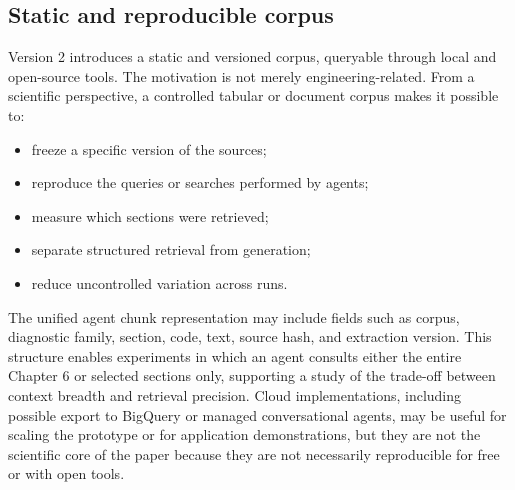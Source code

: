 \documentclass[11pt,a4paper]{article}
\begin{document}
\subsection{Static and reproducible corpus}
Version 2 introduces a static and versioned corpus, queryable through local and open-source tools. The motivation is not merely engineering-related. From a scientific perspective, a controlled tabular or document corpus makes it possible to:
\begin{itemize}
  \item freeze a specific version of the sources;
  \item reproduce the queries or searches performed by agents;
  \item measure which sections were retrieved;
  \item separate structured retrieval from generation;
  \item reduce uncontrolled variation across runs.
\end{itemize}

The unified agent chunk representation may include fields such as corpus, diagnostic family, section, code, text, source hash, and extraction version. This structure enables experiments in which an agent consults either the entire Chapter 6 or selected sections only, supporting a study of the trade-off between context breadth and retrieval precision. Cloud implementations, including possible export to BigQuery or managed conversational agents, may be useful for scaling the prototype or for application demonstrations, but they are not the scientific core of the paper because they are not necessarily reproducible for free or with open tools.
\end{document}
